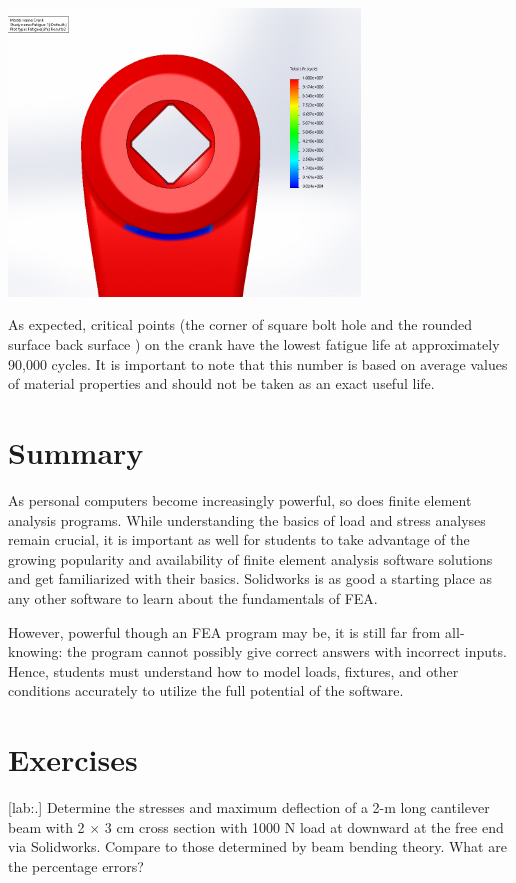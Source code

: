 \documentclass[a4paper,openany,12pt]{book}
\begin{document}
{{\begin{center}
\includegraphics[width=0.7\textwidth]{pictures/Intro-CAD/Crank-fatigue-back.jpg}
\end{center}

As expected, critical points (the corner of square bolt hole and the
rounded surface back surface ) on the crank have the lowest fatigue life
at approximately 90,000 cycles. It is important to note that this number
is based on average values of material properties and should not be
taken as an exact useful life.

\section{Summary}
\label{sec:org30d58a9}
As personal computers become increasingly powerful, so does finite
element analysis programs. While understanding the basics of load and
stress analyses remain crucial, it is important as well for students to
take advantage of the growing popularity and availability of finite
element analysis software solutions and get familiarized with their
basics. Solidworks is as good a starting place as any other software to
learn about the fundamentals of FEA.

However, powerful though an FEA program may be, it is still far from
all-knowing: the program cannot possibly give correct answers with
incorrect inputs. Hence, students must understand how to model loads,
fixtures, and other conditions accurately to utilize the full potential
of the software.

\section{Exercises}
\label{sec:org91028c0}
[lab:.] Determine the stresses and
maximum deflection of a 2-m long cantilever beam with 2 \(\times\) 3 cm
cross section with 1000 N load at downward at the free end via
Solidworks. Compare to those determined by beam bending theory. What are
the percentage errors?

}}
\end{document}
